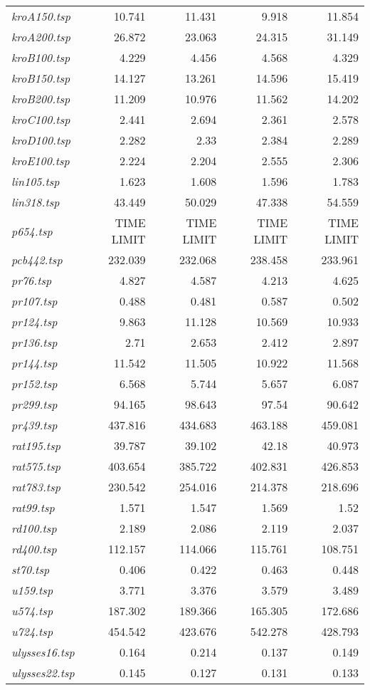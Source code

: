{\begin{longtable}[H]{lrrrr}
\textit{kroA150.tsp} & 10.741 & 11.431 & 9.918 & 11.854\\
\textit{kroA200.tsp} & 26.872 & 23.063 & 24.315 & 31.149\\
\textit{kroB100.tsp} & 4.229 & 4.456 & 4.568 & 4.329\\
\textit{kroB150.tsp} & 14.127 & 13.261 & 14.596 & 15.419\\
\textit{kroB200.tsp} & 11.209 & 10.976 & 11.562 & 14.202\\
\textit{kroC100.tsp} & 2.441 & 2.694 & 2.361 & 2.578\\
\textit{kroD100.tsp} & 2.282 & 2.33 & 2.384 & 2.289\\
\textit{kroE100.tsp} & 2.224 & 2.204 & 2.555 & 2.306\\
\textit{lin105.tsp} & 1.623 & 1.608 & 1.596 & 1.783\\
\textit{lin318.tsp} & 43.449 & 50.029 & 47.338 & 54.559\\
\textit{p654.tsp} & TIME LIMIT & TIME LIMIT & TIME LIMIT & TIME LIMIT\\
\textit{pcb442.tsp} & 232.039 & 232.068 & 238.458 & 233.961\\
\textit{pr76.tsp} & 4.827 & 4.587 & 4.213 & 4.625\\
\textit{pr107.tsp} & 0.488 & 0.481 & 0.587 & 0.502\\
\textit{pr124.tsp} & 9.863 & 11.128 & 10.569 & 10.933\\
\textit{pr136.tsp} & 2.71 & 2.653 & 2.412 & 2.897\\
\textit{pr144.tsp} & 11.542 & 11.505 & 10.922 & 11.568\\
\textit{pr152.tsp} & 6.568 & 5.744 & 5.657 & 6.087\\
\textit{pr299.tsp} & 94.165 & 98.643 & 97.54 & 90.642\\
\textit{pr439.tsp} & 437.816 & 434.683 & 463.188 & 459.081\\
\textit{rat195.tsp} & 39.787 & 39.102 & 42.18 & 40.973\\
\textit{rat575.tsp} & 403.654 & 385.722 & 402.831 & 426.853\\
\textit{rat783.tsp} & 230.542 & 254.016 & 214.378 & 218.696\\
\textit{rat99.tsp} & 1.571 & 1.547 & 1.569 & 1.52\\
\textit{rd100.tsp} & 2.189 & 2.086 & 2.119 & 2.037\\
\textit{rd400.tsp} & 112.157 & 114.066 & 115.761 & 108.751\\
\textit{st70.tsp} & 0.406 & 0.422 & 0.463 & 0.448\\
\textit{u159.tsp} & 3.771 & 3.376 & 3.579 & 3.489\\
\textit{u574.tsp} & 187.302 & 189.366 & 165.305 & 172.686\\
\textit{u724.tsp} & 454.542 & 423.676 & 542.278 & 428.793\\
\textit{ulysses16.tsp} & 0.164 & 0.214 & 0.137 & 0.149\\
\textit{ulysses22.tsp} & 0.145 & 0.127 & 0.131 & 0.133\\
\hline
\end{longtable}
}

